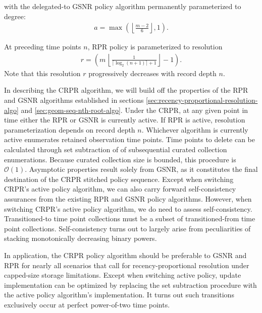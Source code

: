 with the delegated-to GSNR policy algorithm permanently parameterized to degree:
\begin{align*}
a = \max \left(
  \left\lfloor \frac{m - 2}{6} \right\rfloor,
  1
\right).
\end{align*}

At preceding time points $n$, RPR policy is parameterized to resolution
\begin{align*}
r = \left(
  m \,
  \left\lfloor
  \frac{1}{\lceil \log_2(n + 1) \rceil + 1}
  \right\rfloor
  - 1
\right).
\end{align*}
Note that this resolution $r$ progressively decreases with record depth $n$.

In describing the CRPR algorithm, we will build off the properties of the RPR and GSNR algorithms established in sections \ref{sec:recency-proportional-resolution-algo} and \ref{sec:geom-seq-nth-root-algo}.
Under the CRPR, at any given point in time either the RPR or GSNR is currently active.
If RPR is active, resolution parameterization depends on record depth $n$.
Whichever algorithm is currently active enumerates retained observation time points.
Time points to delete can be calculated through set subtraction of of subsequential curated collection enumerations.
Because curated collection size is bounded, this procedure is $\mathcal{O}(1)$.
Asymptotic properties result solely from GSNR, as it constitutes the final destination of the CRPR stitched policy sequence.
Except when switching CRPR's active policy algorithm, we can also carry forward self-consistency assurances from the existing RPR and GSNR policy algorithms.
However, when switching CRPR's active policy algorithm, we do need to assess self-consistency.
Transitioned-to time point collections must be a subset of transitioned-from time point collections.
Self-consistency turns out to largely arise from peculiarities of stacking monotonically decreasing binary powers.


In application, the CRPR policy algorithm should be preferable to GSNR and RPR for nearly all scenarios that call for recency-proportional resolution under capped-size storage limitations.
Except when switching active policy, update implementation can be optimized by replacing the set subtraction procedure with the active policy algorithm's implementation.
It turns out such transitions exclusively occur at perfect power-of-two time points.

% 
